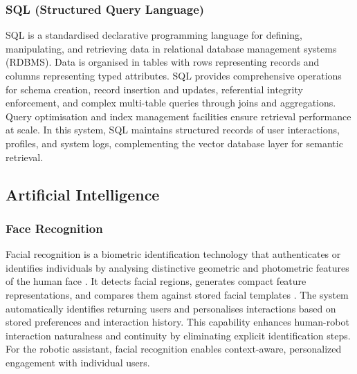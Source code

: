 \subsubsection{SQL (Structured Query Language)}

SQL is a standardised declarative programming language for defining, manipulating, and retrieving data in relational database management systems (RDBMS). Data is organised in tables with rows representing records and columns representing typed attributes. SQL provides comprehensive operations for schema creation, record insertion and updates, referential integrity enforcement, and complex multi-table queries through joins and aggregations. Query optimisation and index management facilities ensure retrieval performance at scale. In this system, SQL maintains structured records of user interactions, profiles, and system logs, complementing the vector database layer for semantic retrieval.

\subsection{Artificial Intelligence}

\subsubsection{Face Recognition}

Facial recognition is a biometric identification technology that authenticates or identifies individuals by analysing distinctive geometric and photometric features of the human face \cite{innovatrics}. It detects facial regions, generates compact feature representations, and compares them against stored facial templates \cite{zaragoza2024}. The system automatically identifies returning users and personalises interactions based on stored preferences and interaction history. This capability enhances human-robot interaction naturalness and continuity by eliminating explicit identification steps. For the robotic assistant, facial recognition enables context-aware, personalized engagement with individual users.

